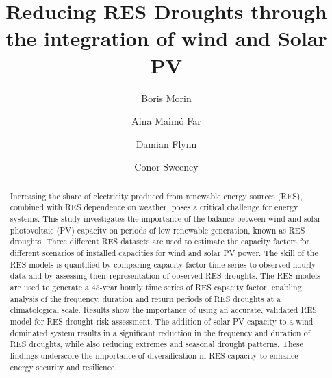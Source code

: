 \documentclass[preprint, 12pt]{elsarticle}
\begin{document}
\begin{frontmatter}
	

\title{Reducing RES Droughts through the integration of wind and Solar PV}

\author[Math]{Boris Morin }

\author[Math]{Aina Maimó Far}

\author[Eng]{Damian Flynn}

\author[Math]{Conor Sweeney}




\begin{abstract}
Increasing the share of electricity produced from renewable energy sources (RES), combined with RES dependence on weather, poses a critical challenge for energy systems. This study investigates the importance of the balance between wind and solar photovoltaic (PV) capacity on periods of low renewable generation, known as RES droughts. Three different RES datasets are used to estimate the capacity factors for different scenarios of installed capacities for wind and solar PV power. The skill of the RES models is quantified by comparing capacity factor time series to observed hourly data and by assessing their representation of observed RES droughts. The RES models are used to generate a 45-year hourly time series of RES capacity factor, enabling analysis of the frequency, duration and return periods of RES droughts at a climatological scale. Results show the importance of using an accurate, validated RES model for RES drought risk assessment. The addition of solar PV capacity to a wind-dominated system results in a significant reduction in the frequency and duration of RES droughts, while also reducing extremes and seasonal drought patterns. These findings underscore the importance of diversification in RES capacity to enhance energy security and resilience.
\end{abstract}


\end{frontmatter}
\end{document}
